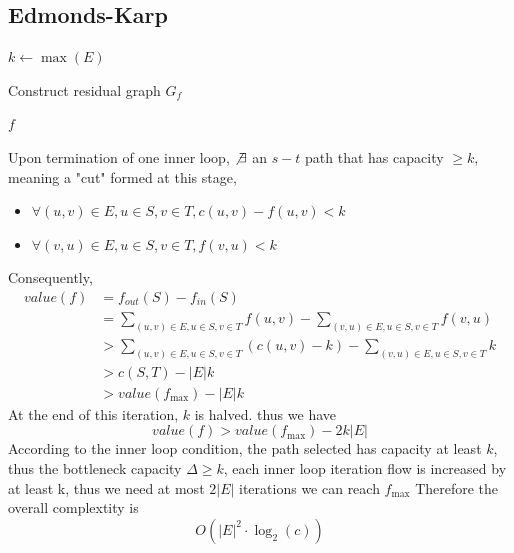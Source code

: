 \documentclass[10pt]{article}
\theoremstyle{definition}
\begin{document}
\subsection{Edmonds-Karp}
\begin{algorithm}[H]
  $k\gets \max(E)$\;

  Construct residual graph $G_f$\;

  \Return $f$\;
\end{algorithm}
Upon termination of one inner loop, $\not\exists $ an $s-t$ path that has capacity $\geq k$, meaning a
"cut" formed at this stage, 
\begin{itemize}
  \item $\forall (u, v) \in E, u \in S, v \in T, c(u,v) - f(u, v) < k$
  \item $\forall (v, u) \in E, u \in S, v \in T, f(v, u) < k$
\end{itemize}
Consequently, 
\begin{align*}
value(f) &= f_{out}(S) - f_{in}(S) \\
&= \sum_{(u, v) \in E, u \in S, v \in T} f(u, v) - \sum_{(v, u) \in E, u \in S, v \in T} f(v, u)\\
&>\sum_{(u, v) \in E, u \in S, v \in T} \left(c(u, v) - k\right) - \sum_{(v, u) \in E, u \in S, v \in T} k\\
&> c(S, T) - |E|k\\
&> value(f_{\max}) - |E|k
\end{align*}
At the end of this iteration, $k$ is halved. thus we have 
\[value(f) > value(f_{\max}) - 2k |E|\]
According to the inner loop condition, the path selected has capacity at least $k$, thus the bottleneck capacity
$\Delta \geq k$, each inner loop iteration flow is increased by at least k, thus we need at most $2|E|$ iterations we can reach $f_{\max}$
Therefore the overall complextity is
\[O(|E|^2 \cdot \log_2(c))\]
\end{document}

